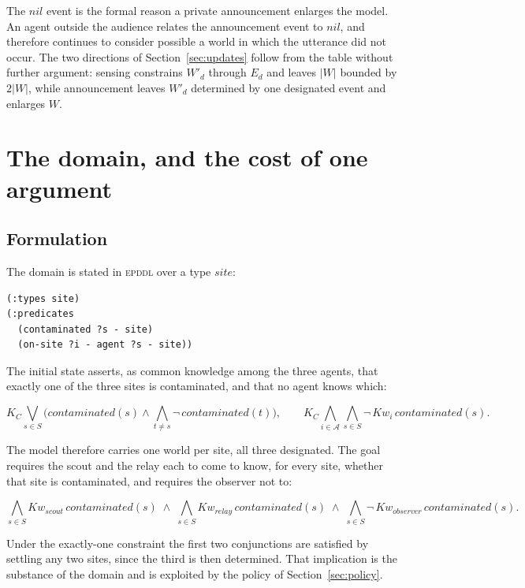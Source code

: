 \documentclass[11pt,a4paper]{article}
\theoremstyle{definition}
\newcommand{\Ag}{\mathcal{A}}
\newcommand{\Kop}[1]{K_{#1}}
\newcommand{\Kw}[1]{\mathit{Kw}_{#1}}
\begin{document}
The $\mathit{nil}$ event is the formal reason a private announcement enlarges
the model. An agent outside the audience relates the announcement event to
$\mathit{nil}$, and therefore continues to consider possible a world in which
the utterance did not occur. The two directions of Section~\ref{sec:updates}
follow from the table without further argument: sensing constrains $W'_d$
through $E_d$ and leaves $|W|$ bounded by $2|W|$, while announcement leaves
$W'_d$ determined by one designated event and enlarges $W$.

\section{The domain, and the cost of one argument}
\label{sec:domain}

\subsection{Formulation}

The domain is stated in \textsc{epddl} over a type $\mathit{site}$:

\begin{lstlisting}
(:types site)
(:predicates
  (contaminated ?s - site)
  (on-site ?i - agent ?s - site))
\end{lstlisting}

\noindent
The initial state asserts, as common knowledge among the three agents, that
exactly one of the three sites is contaminated, and that no agent knows which:

\[
  \Kop{C}\!\!\bigvee_{s \in S}\Big(
      \mathit{contaminated}(s) \wedge
      \bigwedge_{t \neq s} \neg\,\mathit{contaminated}(t)\Big),
  \qquad
  \Kop{C}\!\!\bigwedge_{i \in \Ag}\bigwedge_{s \in S}
      \neg\,\Kw{i}\,\mathit{contaminated}(s).
\]

The model therefore carries one world per site, all three designated. The goal
requires the scout and the relay each to come to know, for every site, whether
that site is contaminated, and requires the observer not to:

\[
  \bigwedge_{s \in S}\Kw{\mathit{scout}}\,\mathit{contaminated}(s)
  \;\wedge\;
  \bigwedge_{s \in S}\Kw{\mathit{relay}}\,\mathit{contaminated}(s)
  \;\wedge\;
  \bigwedge_{s \in S}\neg\,\Kw{\mathit{observer}}\,\mathit{contaminated}(s).
\]

Under the exactly-one constraint the first two conjunctions are satisfied by
settling any two sites, since the third is then determined. That implication is
the substance of the domain and is exploited by the policy of
Section~\ref{sec:policy}.
\end{document}
